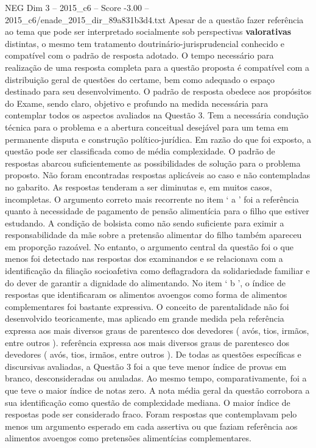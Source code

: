 \begin{textsample}{NEG Dim 3 – 2015\_c6 – Score -3.00 – 2015\_c6/enade\_2015\_dir\_89a831b3d4.txt}
Apesar de a questão fazer referência ao tema que pode ser interpretado socialmente sob perspectivas \textbf{valorativas} distintas, o mesmo tem tratamento doutrinário-jurisprudencial conhecido e compatível com o padrão de resposta adotado.
O tempo necessário para realização de uma resposta completa para a questão proposta é compatível com a distribuição geral de questões do certame, bem como adequado o espaço destinado para seu desenvolvimento.
O padrão de resposta obedece aos propósitos do Exame, sendo claro, objetivo e profundo na medida necessária para contemplar todos os aspectos avaliados na Questão 3.
Tem a necessária condução técnica para o problema e a abertura conceitual desejável para um tema em permanente disputa e construção político-jurídica.
Em razão do que foi exposto, a questão pode ser classificada como de média complexidade.
O padrão de respostas abarcou suficientemente as possibilidades de solução para o problema proposto.
Não foram encontradas respostas aplicáveis ao caso e não contempladas no gabarito.
As respostas tenderam a ser diminutas e, em muitos casos, incompletas.
O argumento correto mais recorrente no item ‘ a ’ foi a referência quanto à necessidade de pagamento de pensão alimentícia para o filho que estiver estudando.
A condição de bolsista como não sendo suficiente para eximir a responsabilidade da mãe sobre a pretensão alimentar do filho também apareceu em proporção razoável.
No entanto, o argumento central da questão foi o que menos foi detectado nas respostas dos examinandos e se relacionava com a identificação da filiação socioafetiva como deflagradora da solidariedade familiar e do dever de garantir a dignidade do alimentando.
No item ‘ b ’, o índice de respostas que identificaram os alimentos avoengos como forma de alimentos complementares foi bastante expressiva.
O conceito de parentalidade não foi desenvolvido teoricamente, mas aplicado em grande medida pela referência expressa aos mais diversos graus de parentesco dos devedores ( avós, tios, irmãos, entre outros ). referência expressa aos mais diversos graus de parentesco dos devedores ( avós, tios, irmãos, entre outros ).
De todas as questões específicas e discursivas avaliadas, a Questão 3 foi a que teve menor índice de provas em branco, desconsideradas ou anuladas.
Ao mesmo tempo, comparativamente, foi a que teve o maior índice de notas zero.
A nota média geral da questão corrobora a sua identificação como questão de complexidade mediana.
O maior índice de respostas pode ser considerado fraco.
Foram respostas que contemplavam pelo menos um argumento esperado em cada assertiva ou que faziam referência aos alimentos avoengos como pretensões alimentícias complementares.

\end{textsample}
